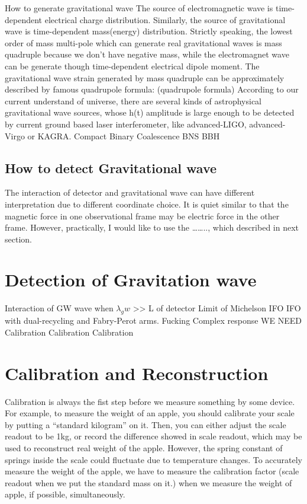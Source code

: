 \documentclass[12pt]{caltech_thesis}
\begin{document}
How to generate gravitational wave
The source of electromagnetic wave is time-dependent electrical charge distribution.  Similarly, the source of gravitational wave is time-dependent mass(energy) distribution. Strictly speaking, the lowest order of mass multi-pole which can generate real gravitational waves is mass quadruple because we don’t have negative mass, while the electromagnet wave can be generate though time-dependent electrical dipole moment. The gravitational wave strain generated by mass quadruple can be approximately described by famous quadrupole formula:
(quadrupole formula)
According to our current understand of universe, there are several kinds of astrophysical gravitational wave sources, whose h(t) amplitude is large enough to be detected by current ground based laser interferometer, like advanced-LIGO, advanced-Virgo or KAGRA.
Compact Binary Coalescence 
BNS BBH
\subsection{How to detect Gravitational wave}
The interaction of detector and gravitational wave can have different interpretation due to different coordinate choice. It is quiet similar to that the magnetic force in one observational frame may be electric force in the other frame. However, practically, I would like to use the …….., which described in next section.


\section{Detection of Gravitation wave}

Interaction of GW wave when $\lambda_gw$ >> L of detector
Limit of Michelson IFO
IFO with dual-recycling and Fabry-Perot  arms.
Fucking Complex response
WE NEED Calibration Calibration Calibration



\section{Calibration and Reconstruction}

Calibration is always the fist step before we measure something by some device.
For example, to measure the weight of an apple, you should calibrate your scale by putting a “standard kilogram” on it. Then, you can either adjust the scale readout to be 1kg, or record the difference showed in scale readout, which may be used to reconstruct real weight of the apple. However, the spring constant of springs inside the scale could fluctuate due to temperature changes. To accurately measure the weight of the apple, we have to measure the calibration factor (scale readout when we put the standard mass on it.) when we measure the weight of apple, if possible, simultaneously.
\end{document}
